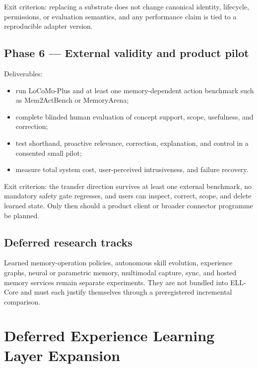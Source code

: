 \documentclass[
  english,
  a4paper,
  DIV=11,
  numbers=noendperiod]{scrreprt}
\providecommand{\tightlist}{%
  \setlength{\itemsep}{0pt}\setlength{\parskip}{0pt}}
\begin{document}
Exit criterion: replacing a substrate does not change canonical
identity, lifecycle, permissions, or evaluation semantics, and any
performance claim is tied to a reproducible adapter version.

\section{Phase 6 --- External validity and product
pilot}\label{phase-6-external-validity-and-product-pilot}

Deliverables:

\begin{itemize}
\tightlist
\item
  run LoCoMo-Plus and at least one memory-dependent action benchmark
  such as Mem2ActBench or MemoryArena;
\item
  complete blinded human evaluation of concept support, scope,
  usefulness, and correction;
\item
  test shorthand, proactive relevance, correction, explanation, and
  control in a consented small pilot;
\item
  measure total system cost, user-perceived intrusiveness, and failure
  recovery.
\end{itemize}

Exit criterion: the transfer direction survives at least one external
benchmark, no mandatory safety gate regresses, and users can inspect,
correct, scope, and delete learned state. Only then should a product
client or broader connector programme be planned.

\section{Deferred research tracks}\label{deferred-research-tracks}

Learned memory-operation policies, autonomous skill evolution,
experience graphs, neural or parametric memory, multimodal capture,
sync, and hosted memory services remain separate experiments. They are
not bundled into ELL-Core and must each justify themselves through a
preregistered incremental comparison.


\chapter{Deferred Experience Learning Layer
Expansion}\label{deferred-experience-learning-layer-expansion}
\end{document}

